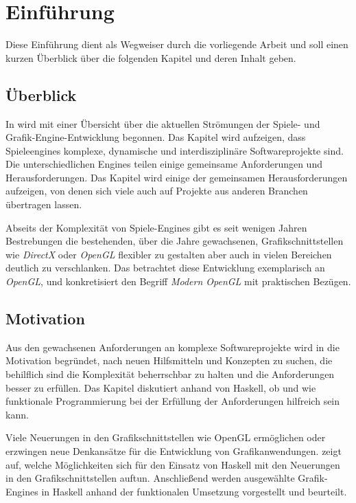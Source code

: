 \chapter{Einführung}

Diese Einführung dient als Wegweiser durch die vorliegende Arbeit und soll einen kurzen Überblick über die folgenden Kapitel und deren Inhalt geben.

\section{Überblick}

In  wird mit einer Übersicht über die aktuellen Strömungen der Spiele- und Grafik-Engine-Entwicklung begonnen. Das Kapitel wird aufzeigen, dass Spieleengines komplexe, dynamische und interdisziplinäre Softwareprojekte sind. Die unterschiedlichen Engines teilen einige gemeinsame Anforderungen und Herausforderungen. Das Kapitel wird einige der gemeinsamen Herausforderungen aufzeigen, von denen sich viele auch auf Projekte aus anderen Branchen übertragen lassen.

Abseits der Komplexität von Spiele-Engines gibt es seit wenigen Jahren Bestrebungen die bestehenden, über die Jahre gewachsenen, Grafikschnittstellen wie \textit{DirectX} oder \textit{OpenGL} flexibler zu gestalten aber auch in vielen Bereichen deutlich zu verschlanken. Das  betrachtet diese Entwicklung exemplarisch an \textit{OpenGL}, und konkretisiert den Begriff \textit{Modern OpenGL} mit praktischen Bezügen.

\section{Motivation}

Aus den gewachsenen Anforderungen an komplexe Softwareprojekte wird in  die Motivation begründet, nach neuen Hilfsmitteln und Konzepten zu suchen, die behilflich sind die Komplexität beherrschbar zu halten und die Anforderungen besser zu erfüllen. Das Kapitel diskutiert anhand von Haskell, ob und wie funktionale Programmierung bei der Erfüllung der Anforderungen hilfreich sein kann.

Viele Neuerungen in den Grafikschnittstellen wie OpenGL ermöglichen oder erzwingen neue Denkansätze für die Entwicklung von Grafikanwendungen.  zeigt auf, welche Möglichkeiten sich für den Einsatz von Haskell mit den Neuerungen in den Grafikschnittstellen auftun. Anschließend werden ausgewählte Grafik-Engines in Haskell anhand der funktionalen Umsetzung vorgestellt und beurteilt.

